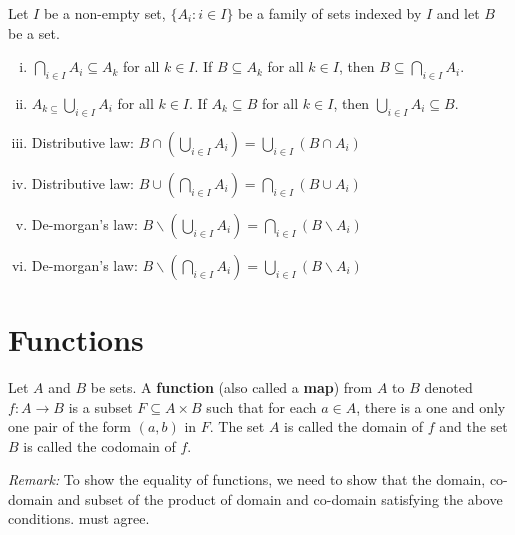 \documentclass[a4paper,english,12pt]{article}
\begin{document}
\begin{thm}
Let $I$ be a non-empty set, $\{ A_{i} : i \in I \}$ be a family of sets indexed by $I$ and let $B$ be a set.
\begin{enumerate}[i)]
 \item $\displaystyle \bigcap_{i \in I} A_{i}  \subseteq A_{k}$ for all $k \in I$. If $B \subseteq A_{k}$ for all $k \in I$, then $B\displaystyle \subseteq \bigcap_{i \in I}A_{i}$.
 \item $A_{k \subseteq} \displaystyle \bigcup_{i \in I} A_{i}$ for all $k \in I$. If $A_{k} \subseteq B$ for all $k \in I$, then $\displaystyle \bigcup_{i \in I}A_{i} \subseteq B$. \\
 \item Distributive law: $\displaystyle B \cap \left( \bigcup_{i \in I}A_{i} \right) = \bigcup_{i \in I} \left( B \cap A_{i} \right)$
 \item Distributive law: $\displaystyle B \cup \left( \bigcap_{i \in I}A_{i} \right) = \bigcap_{i \in I} \left( B \cup A_{i} \right)$
 \item De-morgan's law: $B \backslash \left( \bigcup_{i \in I}A_{i} \right) = \bigcap_{i \in I} \left( B \backslash A_{i} \right)$
 \item De-morgan's law: $B \backslash \left(\bigcap_{i \in I}A_{i} \right) = \bigcup_{i \in I} \left( B \backslash A_{i} \right)$
 \end{enumerate}
\end{thm}


\section{Functions}

\begin{defn} [Function]
 Let $A$ and $B$ be sets. A \textbf{function} (also called a \textbf{map}) from $A$ to $B$ denoted $f: A \to B$ is a subset $F \subseteq A \times B$ such that for 
 each $a \in A$, there is a one and only one pair of the form $(a,b)$ in $F$. The set $A$ is called the domain of $f$ and the set $B$ is called the 
 codomain of $f$.
\end{defn}

\emph{Remark:} To show the equality of functions, we need to show that the domain, co-domain and subset of the product of domain and co-domain satisfying the 
above conditions. must agree.
\end{document}
